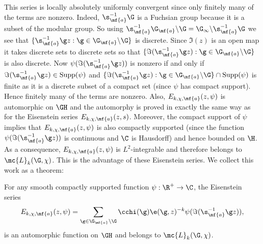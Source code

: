     This series is locally absolutely uniformly convergent since only finitely many of the terms are nonzero. Indeed, $\s_{\mf{a}}^{-1}\G$ is a Fuchsian group because it is a subset of the modular group. So using $\s_{\mf{a}}^{-1}\G_{\mf{a}}\backslash\G = \G_{\infty}\backslash\s_{\mf{a}}^{-1}\G$ we see that $\{\s_{\mf{a}}^{-1}\g z:\g \in \G_{\mf{a}}\backslash\G\}$ is discrete. Since $\Im(z)$ is an open map it takes discrete sets to discrete sets so that $\{\Im(\s_{\mf{a}}^{-1}\g z):\g \in \G_{\mf{a}}\backslash\G\}$ is also discrete. Now $\psi(\Im(\s_{\mf{a}}^{-1}\g z))$ is nonzero if and only if $\Im(\s_{\mf{a}}^{-1}\g z) \in \mathrm{Supp}(\psi)$ and $\{\Im(\s_{\mf{a}}^{-1}\g z):\g \in \G_{\mf{a}}\backslash\G\} \cap \mathrm{Supp}(\psi)$ is finite as it is a discrete subset of a compact set (since $\psi$ has compact support). Hence finitely many of the terms are nonzero. Also, $E_{k,\chi,\mf{a}}(z,\psi)$ is automorphic on $\GH$ and the automorphy is proved in exactly the same way as for the Eisenstein series $E_{k,\chi,\mf{a}}(z,s)$. Moreover, the compact support of $\psi$ implies that $E_{k,\chi,\mf{a}}(z,\psi)$ is also compactly supported (since the function $\psi(\Im(\s_{\mf{a}}^{-1}\g z))$ is continuous and $\C$ is Hausdorff) and hence bounded on $\H$. As a consequence, $E_{k,\chi,\mf{a}}(z,\psi)$ is $L^{2}$-integrable and therefore belongs to $\mc{L}_{k}(\G,\chi)$. This is the advantage of these Eisenstein series. We collect this work as a theorem:

    \begin{theorem}
      For any smooth compactly supported function $\psi:\R^{+} \to \C$, the Eisenstein series
      \[
        E_{k,\chi,\mf{a}}(z,\psi) = \sum_{\g \in \G_{\mf{a}}\backslash\G}\cchi(\g)\e(\g,z)^{-k}\psi(\Im(\s_{\mf{a}}^{-1}\g z)),
      \]
      is an automorphic function on $\GH$ and belongs to $\mc{L}_{k}(\G,\chi)$.
    \end{theorem}
    
